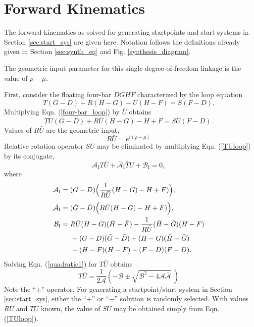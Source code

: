 \documentclass[journal]{IEEEtran}
\def\*#1{\bar{#1}} %
\begin{document}
\section{Forward Kinematics}
\label{app:fwd_kin}

The forward kinematics as solved for generating startpoints and start systems in Section \ref{sec:start_sys} are given here.
Notation follows the definitions already given in Section \ref{sec:synth_eq} and Fig. \ref{synthesis_diagram}.

The geometric input parameter for this single degree-of-freedom linkage is the value of $\rho-\mu$.

First, consider the floating four-bar $DGHF$ characterized by the loop equation
\begin{equation}
T(G-D) + R(H-G) - U(H-F) = S(F-D). \label{four-bar_loop}
\end{equation}
Multiplying Eqn. (\ref{four-bar_loop}) by $\*U$ obtains
\begin{equation}
T\*U(G-D) + R\*U(H-G) - H+F = S\*U(F-D). \label{TUloop}
\end{equation}
Values of $R\*U$ are the geometric input,
\begin{equation}
R\*U = e^{i(\rho-\mu)}
\end{equation}
Relative rotation operator $S\*U$ may be eliminated by multiplying Eqn. (\ref{TUloop}) by its conjugate,
\begin{equation}
\mathcal{A}_\text{I} T\*U + \*{\mathcal{A}}_\text{I} \*TU + \mathcal{B}_\text{I} = 0,
\label{quadratic1}
\end{equation}
where
\begin{align}
\mathcal{A}_\text{I} &= (G-D) \Big( \frac{1}{R\*U} (\*H-\*G) - \*H+\*F) \Big), \\[1mm]
\*{\mathcal{A}}_\text{I} &= (\*G-\*D) \Big( R\*U(H-G) - H+F) \Big), \nonumber\\
\mathcal{B}_\text{I} &= R\*U(H-G)(\*H-\*F) - \frac{1}{R\*U}(\*H-\*G)(H-F) \nonumber\\
&\hspace{5mm} + (G-D)(\*G-\*D) + (H-G)(\*H-\*G) \nonumber\\
&\hspace{5mm} + (H-F)(\*H-\*F) - (F-D)(\*F-\*D). \nonumber
\end{align}
Solving Eqn. (\ref{quadratic1}) for $T\*U$ obtains
\begin{equation}
T\*U = \frac{1}{2\mathcal{A}}\left( -\mathcal{B} \pm \sqrt{\mathcal{B}^2 - 4\mathcal{A}\*{\mathcal{A}} }\; \right)
\end{equation}
Note the ``$\pm$'' operator.
For generating a startpoint/start system in Section \ref{sec:start_sys}, either the ``$+$'' or ``$-$'' solution is randomly selected.
With values $R\*U$ and $T\*U$ known, the value of $S\*U$ may be obtained simply from Eqn. (\ref{TUloop}).
\end{document}

